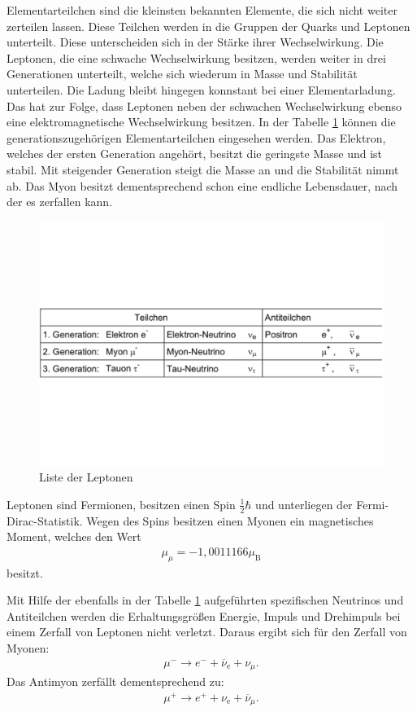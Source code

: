 Elementarteilchen sind die kleinsten bekannten Elemente, die sich nicht weiter zerteilen lassen.
Diese Teilchen werden in die Gruppen der Quarks und Leptonen unterteilt.
Diese unterscheiden sich in der Stärke ihrer Wechselwirkung.
Die Leptonen, die eine schwache Wechselwirkung besitzen, werden weiter in drei Generationen unterteilt, welche sich wiederum in Masse und Stabilität unterteilen.
Die Ladung bleibt hingegen konnstant bei einer Elementarladung.
Das hat zur Folge, dass Leptonen neben der schwachen Wechselwirkung ebenso eine elektromagnetische Wechselwirkung besitzen.
In der Tabelle \ref{fig:gen} können die generationszugehörigen Elementarteilchen eingesehen werden.
Das Elektron, welches der ersten Generation angehört, besitzt die geringste Masse und ist stabil.
Mit steigender Generation steigt die Masse an und die Stabilität nimmt ab.
Das Myon besitzt dementsprechend schon eine endliche Lebensdauer, nach der es zerfallen kann.

\begin{figure}[h!]
  \centering
  \includegraphics[width=\textwidth]{tableptonen.pdf}
  \caption{Liste der Leptonen}
  \label{fig:gen}
\end{figure}
\FloatBarrier

Leptonen sind Fermionen, besitzen einen Spin $\frac{1}{2}\hbar$ und unterliegen der Fermi-Dirac-Statistik.
Wegen des Spins besitzen einen Myonen ein magnetisches Moment, welches den Wert
\begin{align*}
  \mu_{\mu} = -1,0011166\mu_{\text{B}}
\end{align*}
besitzt.

Mit Hilfe der ebenfalls in der Tabelle \ref{fig:gen} aufgeführten spezifischen Neutrinos und Antiteilchen
werden die Erhaltungsgrößen Energie, Impuls und Drehimpuls bei einem Zerfall von Leptonen nicht verletzt.
Daraus ergibt sich für den Zerfall von Myonen:
\begin{align}
  \mu^{-}\rightarrow e^-+\overline{\nu}_\text{e}+\nu_{\mu}.
  \label{eqn:mu-}
\end{align}
Das Antimyon zerfällt dementsprechend zu:
\begin{align}
  \mu^{+}\rightarrow e^++\nu_\text{e}+\overline{\nu}_{\mu}.
  \label{eqn:mu+}
\end{align}

